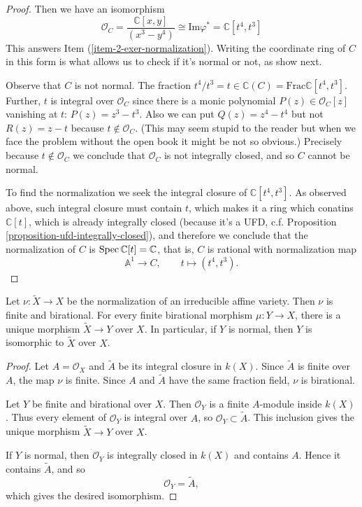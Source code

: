 \begin{proof}
Then we have an isomorphism
$$
\mathcal{O}_C=
\frac{\mathbb{C}[x,y]}{(x^3-y^4)}
\cong \text{Im} \varphi^*
=\mathbb{C}[t^4,t^3]
$$
This answers Item
(\ref{item-2-exer-normalization}).
Writing the coordinate ring of $C$
in this form is what allows us
to check if it's normal or not, as show
next.

Observe that $C$ is not normal.
The fraction $t^4/t^3 = t \in \mathbb{C}(C)
=\text{Frac}\mathbb{C}[t^4,t^3]$.
Further, $t$ is integral over
$\mathcal{O}_C$ since there is a 
monic polynomial 
$P(z)\in \mathcal{O}_C[z]$
vanishing at $t$:
$P(z)=z^3-t^3$. Also we can put
$Q(z)=z^4-t^4$ but not
$R(z)=z-t$ because 
$t \not \in \mathcal{O}_C$.
(This may seem stupid to the reader
but when we face the problem without
the open book it might be not so obvious.)
Precisely because $t \not \in \mathcal{O}_C$
we conclude that $\mathcal{O}_C$
is not integrally closed, and so $C$ cannot
be normal.

To find the normalization we seek
the integral closure of 
$\mathbb{C}[t^4,t^3]$.
As observed above,
such integral closure must contain $t$,
which makes it a ring which conatins
$\mathbb{C}[t]$,
which is already integrally closed
(because it's a UFD,
c.f. Proposition
\ref{proposition-ufd-integrally-closed}),
and therefore we conclude that the
normalization of $C$ is
$\mathop{\mathrm{Spec}}\mathbb{C}[t]=\mathbb{C}$,
that is, $C$ is rational
with normalization map
$$
\mathbb A^1\longrightarrow C,
\qquad
t\longmapsto (t^4,t^3).
$$
\end{proof}

\begin{lemma}
\label{lemma-universal-property-%
normalization}
Let $\nu:\tilde{X}\to X$ be the
normalization of an irreducible affine
variety.
Then $\nu$ is finite and birational.
For every finite birational morphism
$\mu:Y\to X$, there is a unique morphism
$\tilde{X}\to Y$ over $X$.
In particular, if $Y$ is normal, then
$Y$ is isomorphic to $\tilde{X}$ over $X$.
\end{lemma}

\begin{proof}
Let $A=\mathcal{O}_X$ and
$\tilde{A}$ be its integral closure in
$k(X)$.
Since $\tilde{A}$ is finite over $A$,
the map $\nu$ is finite.
Since $A$ and $\tilde{A}$ have the same
fraction field, $\nu$ is birational.

Let $Y$ be finite and birational over $X$.
Then $\mathcal{O}_Y$ is a finite
$A$-module inside $k(X)$.
Thus every element of $\mathcal{O}_Y$
is integral over $A$, so
$\mathcal{O}_Y\subset \tilde{A}$.
This inclusion gives the unique morphism
$\tilde{X}\to Y$ over $X$.

If $Y$ is normal, then $\mathcal{O}_Y$
is integrally closed in $k(X)$ and contains
$A$.
Hence it contains $\tilde{A}$, and so
$$
\mathcal{O}_Y=\tilde{A},
$$
which gives the desired isomorphism.
\end{proof}

